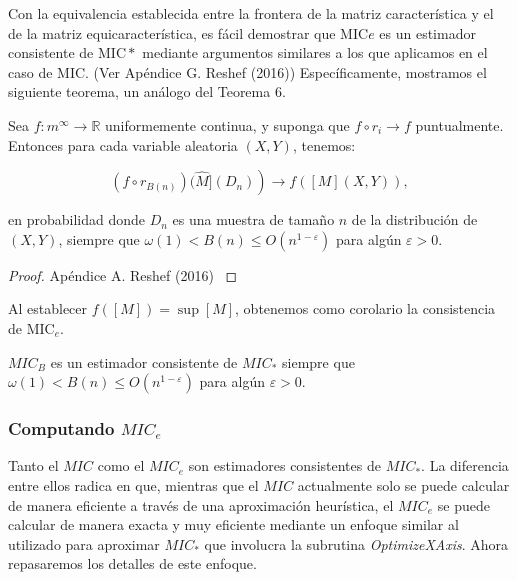     
        Con la equivalencia establecida entre la frontera de la matriz caracter\'istica y el de la matriz equicaracter\'istica, es f\'acil demostrar que $\mathrm{MIC}e$ es un estimador consistente de $\mathrm{MIC}*$ mediante argumentos similares a los que aplicamos en el caso de MIC. (Ver Ap\'endice G. Reshef (2016)\cite{Reshef2016}) Espec\'ificamente, mostramos el siguiente teorema, un an\'alogo del Teorema 6.
        
        \begin{thm}
            Sea $f: m^{\infty} \rightarrow \mathbb{R}$ uniformemente continua, y suponga que $f \circ r_i \rightarrow f$ puntualmente. Entonces para cada variable aleatoria $(X, Y)$, tenemos:
    
            $$
            \left.\left(f \circ r_{B(n)}\right)(\widehat{M}]\left(D_n\right)\right) \rightarrow f([M](X, Y)),
            $$
    
            en probabilidad donde $D_n$ es una muestra de tama\~no $n$ de la distribuci\'on de $(X, Y)$, siempre que $\omega(1)<B(n) \leq O\left(n^{1-\varepsilon}\right)$ para alg\'un $\varepsilon>0$.
        \end{thm}
        \begin{proof}
            Ap\'endice A. Reshef (2016) \cite{Reshef2016}
        \end{proof}
    
        Al establecer $f([M])=\sup [M]$, obtenemos como corolario la consistencia de $\mathrm{MIC}_e$.
        
        \begin{cor}
            $M I C_{B}$ es un estimador consistente de $M I C_*$ siempre que $\omega(1)<B(n) \leq O\left(n^{1-\varepsilon}\right)$ para alg\'un $\varepsilon>0$.
        \end{cor}
    
        \subsubsection[computando mic e ]{Computando $MIC_e$}
    
        Tanto el $MIC$ como el $MIC_e$ son estimadores consistentes de $MIC_*$. La diferencia entre ellos radica en que, mientras que el $MIC$ actualmente solo se puede calcular de manera eficiente a trav\'es de una aproximaci\'on heur\'istica, el $MIC_e$ se puede calcular de manera exacta y muy eficiente mediante un enfoque similar al utilizado para aproximar $MIC_*$ que involucra la subrutina \textit{OptimizeXAxis}. Ahora repasaremos los detalles de este enfoque.
    
